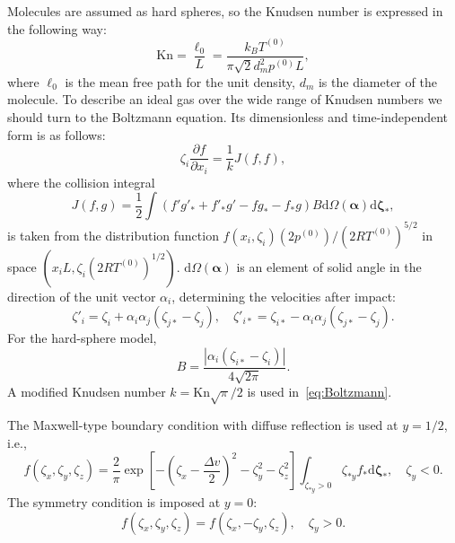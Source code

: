 \documentclass[aip,pof,preprint]{revtex4-1}
\newcommand{\Kn}{\mathrm{Kn}}
\newcommand{\dd}{\mathrm{d}}
\newcommand{\pder}[2][]{\frac{\partial#1}{\partial#2}}
\newcommand{\dzeta}{\boldsymbol{\dd\zeta}}
\begin{document}
Molecules are assumed as hard spheres, so the Knudsen number is expressed in the following way:
\begin{equation}\label{eq:Kn_number}
    \Kn = \frac{\ell_0}{L} = \frac{k_BT^{(0)}}{\pi\sqrt{2} d_m^2p^{(0)}L},
\end{equation}
where \(\ell_0\) is the mean free path for the unit density, \(d_m\) is the diameter of the molecule.
To describe an ideal gas over the wide range of Knudsen numbers
we should turn to the Boltzmann equation.
Its dimensionless and time-independent form is as follows:
\begin{equation}\label{eq:Boltzmann}
    \zeta_i\pder[f]{x_i} = \frac1k J(f,f),
\end{equation}
where the collision integral
\begin{equation}\label{eq:ci}
    J(f,g) = \frac12 \int (f'g'_* + f'_*g' - fg_* - f_*g) B
    \dd \Omega(\boldsymbol{\alpha}) \dzeta_*,
\end{equation}
is taken from the distribution function \(f(x_i,\zeta_i)(2p^{(0)})/(2RT^{(0)})^{5/2}\)
in space \((x_iL, \zeta_i(2RT^{(0)})^{1/2})\).
\(\dd \Omega(\boldsymbol{\alpha})\) is an element of solid angle in the direction of the unit vector \(\alpha_i\),
determining the velocities after impact:
\begin{equation}\label{eq:after_impact}
    \zeta'_i = \zeta_i + \alpha_i\alpha_j(\zeta_{j*}-\zeta_j), \quad
    \zeta'_{i*} = \zeta_{i*} - \alpha_i\alpha_j(\zeta_{j*}-\zeta_j).
\end{equation}
For the hard-sphere model,
\begin{equation}\label{eq:ci_kernel}
    B = \frac{|\alpha_i(\zeta_{i*}-\zeta_i)|}{4\sqrt{2\pi}}.
\end{equation}
A modified Knudsen number \(k = \Kn\sqrt\pi/2\) is used in~\eqref{eq:Boltzmann}.

The Maxwell-type boundary condition with diffuse reflection is used at \(y=1/2\), i.e.,
\begin{equation}\label{eq:diffuse_bc}
    f(\zeta_x,\zeta_y,\zeta_z) = \frac2\pi \exp\left[-\left(\zeta_x-\frac{\Delta{v}}{2}\right)^2-\zeta_y^2-\zeta_z^2\right]
        \int_{\zeta_{*y}>0}\zeta_{*y} f_* \dzeta_*, \quad \zeta_y<0.
\end{equation}
The symmetry condition is imposed at \(y=0\):
\begin{equation}\label{eq:specular_bc}
    f(\zeta_x,\zeta_y,\zeta_z) = f(\zeta_x,-\zeta_y,\zeta_z), \quad \zeta_y>0.
\end{equation}
\end{document}
